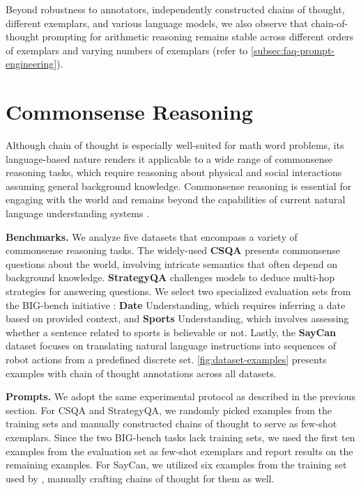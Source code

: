 Beyond robustness to annotators, independently constructed chains of thought, different exemplars, and various language models, we also observe that chain-of-thought prompting for arithmetic reasoning remains stable across different orders of exemplars and varying numbers of exemplars (refer to \cref{subsec:faq-prompt-engineering}).

\section{Commonsense Reasoning}\label{sec:commonsense-reasoning}

Although chain of thought is especially well-suited for math word problems, its language-based nature renders it applicable to a wide range of commonsense reasoning tasks, which require reasoning about physical and social interactions assuming general background knowledge. Commonsense reasoning is essential for engaging with the world and remains beyond the capabilities of current natural language understanding systems \citep{talmor2022commonsenseqa}.

\textbf{Benchmarks.}  
We analyze five datasets that encompass a variety of commonsense reasoning tasks. The widely-used \textbf{CSQA} \citep{talmor-etal-2019-commonsenseqa} presents commonsense questions about the world, involving intricate semantics that often depend on background knowledge.  
\textbf{StrategyQA} \citep{geva-etal-2021-aristotle} challenges models to deduce multi-hop strategies for answering questions. We select two specialized evaluation sets from the BIG-bench initiative \citep{bigbench}: \textbf{Date} Understanding, which requires inferring a date based on provided context, and \textbf{Sports} Understanding, which involves assessing whether a sentence related to sports is believable or not. Lastly, the \textbf{SayCan} dataset \citep{ahn2022can} focuses on translating natural language instructions into sequences of robot actions from a predefined discrete set.  
\cref{fig:dataset-examples} presents examples with chain of thought annotations across all datasets.

\textbf{Prompts.}  
We adopt the same experimental protocol as described in the previous section. For CSQA and StrategyQA, we randomly picked examples from the training sets and manually constructed chains of thought to serve as few-shot exemplars. Since the two BIG-bench tasks lack training sets, we used the first ten examples from the evaluation set as few-shot exemplars and report results on the remaining examples. For SayCan, we utilized six examples from the training set used by \citet{ahn2022can}, manually crafting chains of thought for them as well.

